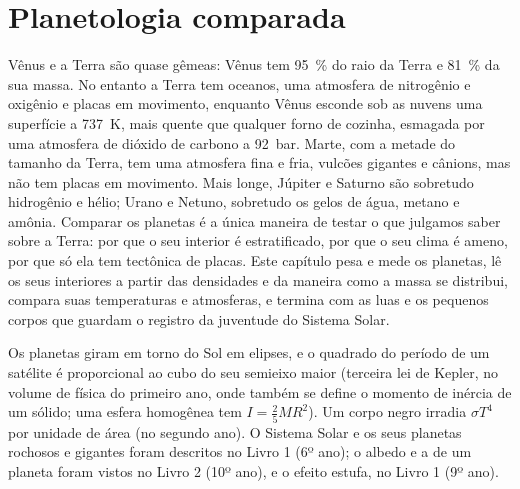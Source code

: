 \chapter{Planetologia comparada}\label{ch:b1:comparative-planetology}

Vênus e a Terra são quase gêmeas: Vênus tem \qty{95}{\percent} do raio da Terra e \qty{81}{\percent} da sua massa. No entanto a Terra tem oceanos, uma atmosfera de nitrogênio e oxigênio e placas em movimento, enquanto Vênus esconde sob as nuvens uma superfície a \qty{737}{K}, mais quente que qualquer forno de cozinha, esmagada por uma atmosfera de dióxido de carbono a \qty{92}{bar}. Marte, com a metade do tamanho da Terra, tem uma atmosfera fina e fria, vulcões gigantes e cânions, mas não tem placas em movimento. Mais longe, Júpiter e Saturno são sobretudo hidrogênio e hélio; Urano e Netuno, sobretudo os gelos de água, metano e amônia. Comparar os planetas é a única maneira de testar o que julgamos saber sobre a Terra: por que o seu interior é estratificado, por que o seu clima é ameno, por que só ela tem tectônica de placas. Este capítulo pesa e mede os planetas, lê os seus interiores a partir das densidades e da maneira como a massa se distribui, compara suas temperaturas e atmosferas, e termina com as luas e os pequenos corpos que guardam o registro da juventude do Sistema Solar.

\begin{recall}
Os planetas giram em torno do Sol em elipses, e o quadrado do período de um satélite é proporcional ao cubo do seu semieixo maior (terceira lei de Kepler, no volume de física do primeiro ano, onde também se define o momento de inércia de um sólido; uma esfera homogênea tem $I = \tfrac25MR^2$). Um corpo negro irradia $\sigma T^4$ por unidade de área (no segundo ano). O Sistema Solar e os seus planetas rochosos e gigantes foram descritos no Livro 1 (6º ano); o albedo e a  de um planeta foram vistos no Livro 2 (10º ano), e o efeito estufa, no Livro 1 (9º ano).
\end{recall}

